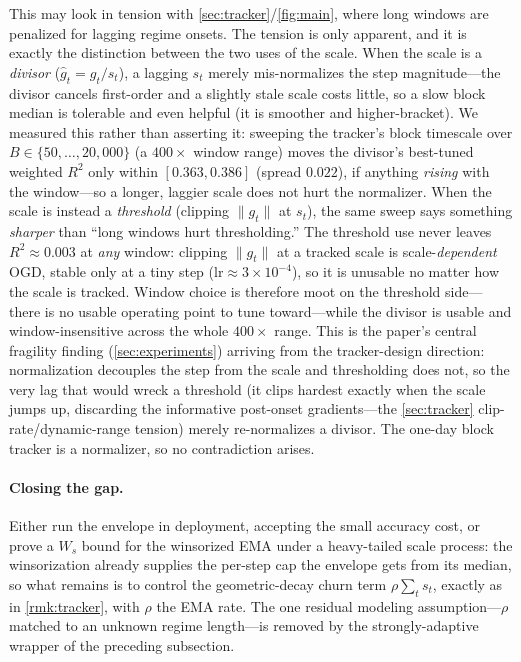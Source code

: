 \documentclass{article}
\newcommand{\norm}[1]{\lVert #1 \rVert}
\newcommand{\gt}{g_t}
\begin{document}
This may look in tension with \cref{sec:tracker}/\cref{fig:main}, where long windows are
penalized for lagging regime onsets. The tension is only apparent, and it is exactly the
distinction between the two uses of the scale. When the scale is a \emph{divisor}
($\hat{g}_t=\gt/s_t$), a lagging $s_t$ merely mis-normalizes the step magnitude---the divisor
cancels first-order and a slightly stale scale costs little, so a slow block median is
tolerable and even helpful (it is smoother and higher-bracket). We measured this rather than
asserting it: sweeping the tracker's block timescale over $B\in\{50,\dots,20{,}000\}$ (a
$400\times$ window range) moves the divisor's best-tuned weighted $R^2$ only within
$[0.363,0.386]$ (spread $0.022$), if anything \emph{rising} with the window---so a longer,
laggier scale does not hurt the normalizer. When the scale is instead a \emph{threshold}
(clipping $\norm{\gt}$ at $s_t$), the same sweep says something \emph{sharper} than ``long
windows hurt thresholding.'' The threshold use never leaves $R^2\approx0.003$ at \emph{any}
window: clipping $\norm{\gt}$ at a tracked scale is scale-\emph{dependent} OGD, stable only at
a tiny step ($\mathrm{lr}\approx3\times10^{-4}$), so it is unusable no matter how the scale is
tracked. Window choice is therefore moot on the threshold side---there is no usable operating
point to tune toward---while the divisor is usable and window-insensitive across the whole
$400\times$ range. This is the paper's central fragility finding (\cref{sec:experiments})
arriving from the tracker-design direction: normalization decouples the step from the scale and
thresholding does not, so the very lag that would wreck a threshold (it clips hardest exactly
when the scale jumps up, discarding the informative post-onset gradients---the
\cref{sec:tracker} clip-rate/dynamic-range tension) merely re-normalizes a divisor. The
one-day block tracker is a normalizer, so no contradiction arises.

\paragraph{Closing the gap.} Either run the envelope in deployment, accepting the small
accuracy cost, or prove a $W_s$ bound for the winsorized EMA under a heavy-tailed scale
process: the winsorization already supplies the per-step cap the envelope gets from its
median, so what remains is to control the geometric-decay churn term $\rho\sum_t s_t$,
exactly as in \cref{rmk:tracker}, with $\rho$ the EMA rate. The
one residual modeling assumption---$\rho$ matched to an unknown regime length---is
removed by the strongly-adaptive wrapper of the preceding subsection.
\end{document}
